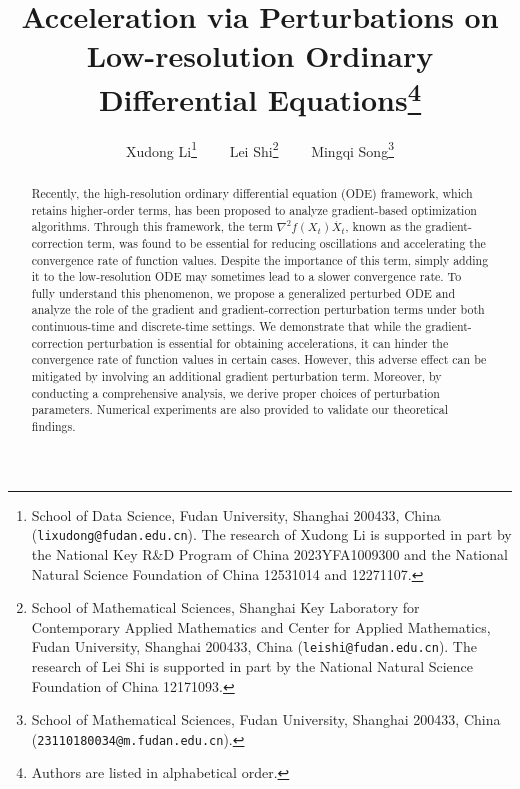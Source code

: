 \documentclass[11pt]{article}
\newcommand{\1}{\mathbf 1}
\numberwithin{equation}{section}
\begin{document}
\title{\huge {Acceleration via Perturbations on Low-resolution Ordinary Differential Equations}\thanks{Authors are listed in alphabetical order.}}
\date{}


\author{Xudong Li\thanks{School of Data Science, Fudan University, Shanghai 200433, China ({\tt  lixudong@fudan.edu.cn}). The research of Xudong Li is
supported in part by the National Key R\&D Program of China 2023YFA1009300 and the National Natural Science Foundation of China 12531014 and 12271107.}
~~~~Lei Shi\thanks{School of Mathematical Sciences, Shanghai Key Laboratory for Contemporary
Applied Mathematics and Center for Applied Mathematics, Fudan University, Shanghai 200433, China ({\tt   leishi@fudan.edu.cn}).  The research of Lei Shi is
supported in part by the National Natural Science Foundation of China 12171093. }
~~~~Mingqi Song\thanks{School of Mathematical Sciences, Fudan University, Shanghai 200433, China ({\tt  23110180034@m.fudan.edu.cn}).}
}


 
\maketitle


\vskip 0.5cm

\begin{abstract}
    Recently, the high-resolution ordinary differential equation (ODE) framework, which retains higher-order terms, has been proposed to analyze gradient-based optimization algorithms. Through this framework, the term $\nabla^2 f(X_t)\dot{X_t}$, known as the gradient-correction term, was found to be essential for reducing oscillations and accelerating the convergence rate of function values. Despite the importance of this term, simply adding it to the low-resolution ODE may sometimes lead to a slower convergence rate.  To fully understand this phenomenon, we propose a generalized perturbed ODE and analyze the role of the gradient and gradient-correction perturbation terms under both continuous-time and discrete-time settings. We demonstrate that while the gradient-correction perturbation is essential for obtaining accelerations, it can hinder the convergence rate of function values in certain cases. However, this adverse effect can be mitigated by involving an additional gradient perturbation term. Moreover, by conducting a comprehensive analysis, we derive proper choices of perturbation parameters. Numerical experiments are also provided to validate our theoretical findings.
\end{abstract}
\end{document}
